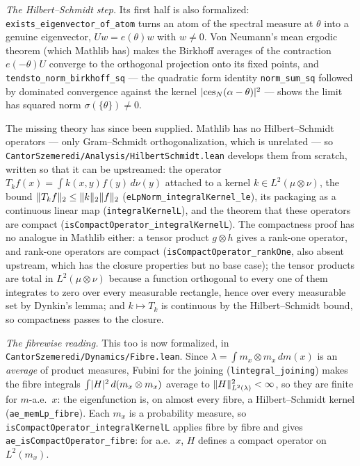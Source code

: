 \begin{remark}
  \smallskip
  \emph{The Hilbert--Schmidt step.}  Its first half is also formalized:
  \texttt{exists\_eigenvector\_of\_atom} turns an atom of the spectral measure at $\theta$ into a
  genuine eigenvector, $Uw = e(\theta)w$ with $w \neq 0$.  Von Neumann's mean ergodic theorem
  (which Mathlib has) makes the Birkhoff averages of the contraction $e(-\theta)U$ converge to
  the orthogonal projection onto its fixed points, and
  \texttt{tendsto\_norm\_birkhoff\_sq} --- the quadratic form identity \texttt{norm\_sum\_sq}
  followed by dominated convergence against the kernel $\lvert \mathrm{ces}_N(\alpha-\theta) \rvert ^2$
  --- shows the limit has squared norm $\sigma(\{\theta\}) \neq 0$.

  The missing theory has since been supplied.  Mathlib has no Hilbert--Schmidt operators ---
  only Gram--Schmidt orthogonalization, which is unrelated --- so
  \texttt{CantorSzemeredi/Analysis/HilbertSchmidt.lean} develops them from scratch, written so
  that it can be upstreamed: the operator $T_k f(x) = \int k(x,y) f(y)\,d\nu(y)$ attached to a
  kernel $k \in L^2(\mu\otimes\nu)$, the bound $\lVert T_k f \rVert_2 \le \lVert k \rVert_2 \lVert f \rVert_2$
  (\texttt{eLpNorm\_integralKernel\_le}), its packaging as a continuous linear map
  (\texttt{integralKernelL}), and the theorem that these operators are compact
  (\texttt{isCompactOperator\_integralKernelL}).  The compactness proof has no analogue in
  Mathlib either: a tensor product $g \otimes h$ gives a rank-one operator, and rank-one
  operators are compact (\texttt{isCompactOperator\_rankOne}, also absent upstream, which has
  the closure properties but no base case); the tensor products are total in
  $L^2(\mu\otimes\nu)$ because a function orthogonal to every one of them integrates to zero
  over every measurable rectangle, hence over every measurable set by Dynkin's lemma; and
  $k \mapsto T_k$ is continuous by the Hilbert--Schmidt bound, so compactness passes to the
  closure.

  \smallskip
  \emph{The fibrewise reading.}  This too is now formalized, in
  \texttt{CantorSzemeredi/Dynamics/Fibre.lean}.  Since
  $\lambda = \int m_x \otimes m_x \,dm(x)$ is an \emph{average} of product measures, Fubini for
  the joining (\texttt{lintegral\_joining}) makes the fibre integrals
  $\int \lvert H \rvert^2 \,d(m_x\otimes m_x)$ average to $\lVert H \rVert_{L^2(\lambda)}^2 < \infty$, so they
  are finite for $m$-a.e.\ $x$: the eigenfunction is, on almost every fibre, a Hilbert--Schmidt
  kernel (\texttt{ae\_memLp\_fibre}).  Each $m_x$ is a probability measure, so
  \texttt{isCompactOperator\_integralKernelL} applies fibre by fibre and gives
  \texttt{ae\_isCompactOperator\_fibre}: for a.e.\ $x$, $H$ defines a compact operator on
  $L^2(m_x)$.


\end{remark}

